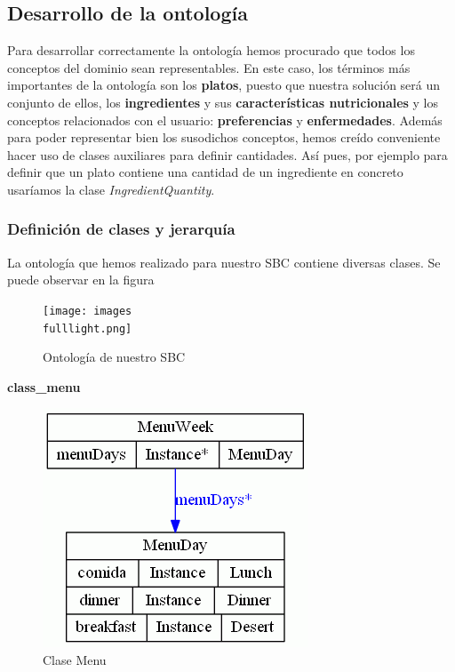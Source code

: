 \documentclass[12]{article}
\begin{document}
\subsection{Desarrollo de la ontología}
Para desarrollar correctamente la ontología hemos procurado que todos los conceptos del dominio sean representables. En este caso, los términos más importantes de la ontología son los \textbf{platos}, puesto que nuestra solución será un conjunto de ellos, los \textbf{ingredientes} y sus \textbf{características nutricionales} y los conceptos relacionados con el usuario: \textbf{preferencias} y \textbf{enfermedades}. Además para poder representar bien los susodichos conceptos, hemos creído conveniente hacer uso de clases auxiliares para definir cantidades. Así pues, por ejemplo para definir que un plato contiene una cantidad de un ingrediente en concreto usaríamos la clase \textit{IngredientQuantity}.
\label{ontologia_apartado}
\subsubsection{Definición de clases y jerarquía}

La ontología que hemos realizado para nuestro SBC contiene diversas clases. Se puede observar en la figura %

\begin{figure}[H]
\centering
\texttt{[image: images\\fulllight.png]}
\caption{Ontología de nuestro SBC}
\label{ontologia}
\end{figure}


\textbf{class\_menu}
\begin{figure}[H]
\centering
\includegraphics[scale=0.5]{images/classMenu.png}
\caption{Clase Menu}
\label{menu}
\end{figure}
\end{document}
